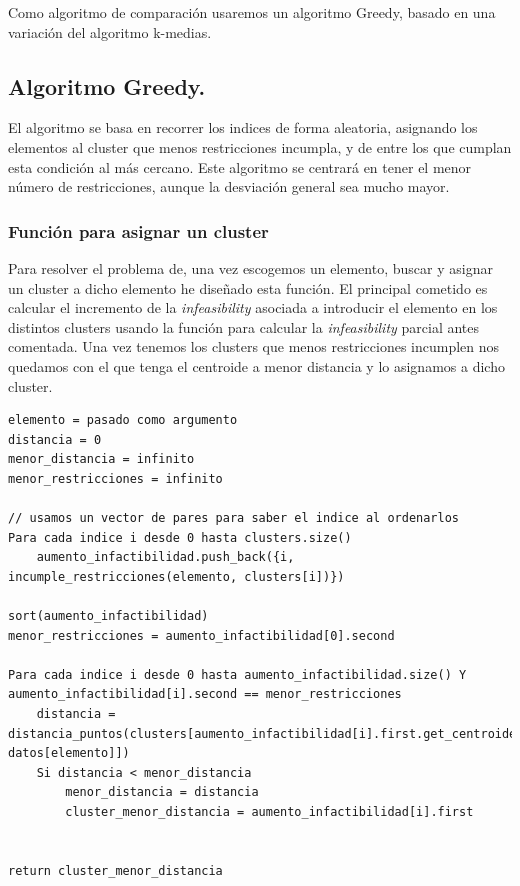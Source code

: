\documentclass[12pt, spanish]{article}
\begin{document}
Como algoritmo de comparación usaremos un algoritmo Greedy, basado en una variación del algoritmo k-medias.

\subsection{Algoritmo Greedy.}

El algoritmo se basa en recorrer los indices de forma aleatoria, asignando los elementos al cluster que menos restricciones incumpla, y de entre los que cumplan esta condición al más cercano. Este algoritmo se centrará en tener el menor número de restricciones, aunque la desviación general sea mucho mayor.

\subsubsection{Función para asignar un cluster}

Para resolver el problema de, una vez escogemos un elemento, buscar y asignar un cluster a dicho elemento he diseñado esta función. El principal cometido es calcular el incremento de la \textit{infeasibility} asociada a introducir el elemento en los distintos clusters usando la función para calcular la \textit{infeasibility} parcial antes comentada. Una vez tenemos los clusters que menos restricciones incumplen nos quedamos con el que tenga el centroide a menor distancia y lo asignamos a dicho cluster.


\begin{lstlisting}
elemento = pasado como argumento
distancia = 0
menor_distancia = infinito
menor_restricciones = infinito

// usamos un vector de pares para saber el indice al ordenarlos
Para cada indice i desde 0 hasta clusters.size()
	aumento_infactibilidad.push_back({i, incumple_restricciones(elemento, clusters[i])})

sort(aumento_infactibilidad)
menor_restricciones = aumento_infactibilidad[0].second

Para cada indice i desde 0 hasta aumento_infactibilidad.size() Y aumento_infactibilidad[i].second == menor_restricciones
	distancia = distancia_puntos(clusters[aumento_infactibilidad[i].first.get_centroide(), datos[elemento]])
	Si distancia < menor_distancia
		menor_distancia = distancia
		cluster_menor_distancia = aumento_infactibilidad[i].first


return cluster_menor_distancia

\end{lstlisting}
\end{document}
